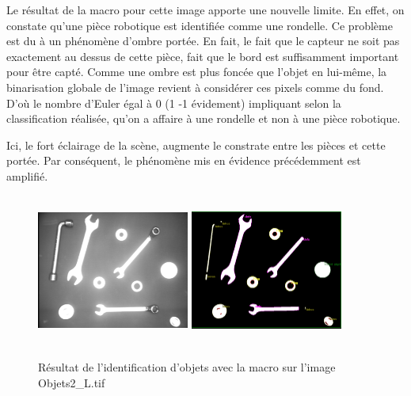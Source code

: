 \documentclass{scrreprt}
\begin{document}
Le résultat de la macro pour cette image apporte une nouvelle limite. En effet, on
constate qu'une pièce robotique est identifiée comme une rondelle. Ce problème est du
à un phénomène d'ombre portée. En fait, le fait que le capteur ne soit pas exactement 
au dessus de cette pièce, fait que le bord est suffisamment important pour être capté.
Comme une ombre est plus foncée que l'objet en lui-même, la binarisation globale de l'image
revient à considérer ces pixels comme du fond. D'où le nombre d'Euler égal à 0 (1 -1 évidement)
impliquant selon la classification réalisée, qu'on a affaire à une rondelle et non à 
une pièce robotique.  


\newpage
Ici, le fort éclairage de la scène, augmente le constrate entre les pièces et cette portée.
Par conséquent, le phénomène mis en évidence précédemment est amplifié. 

\begin{figure}[!h]
\centering
\includegraphics[width=5cm, height=5cm]{images/objet2Lo.png}\hfill
\includegraphics[width=5cm, height=5cm]{images/objet2L.png}
\caption{Résultat de l'identification d'objets avec la macro sur l'image Objets2_L.tif}
\end{figure}
\end{document}
